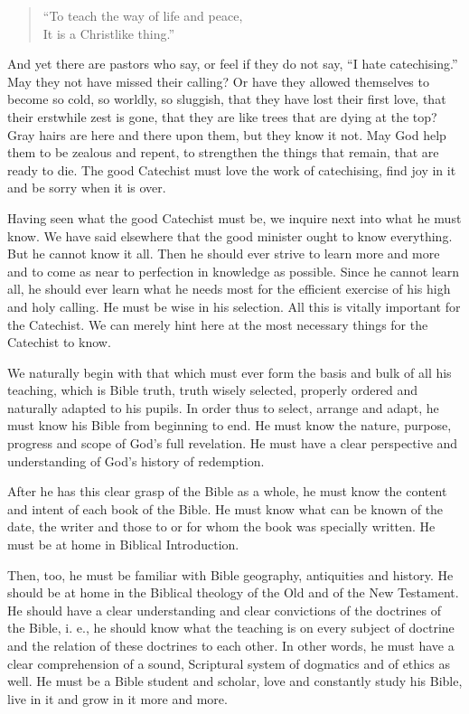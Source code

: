 \begin{quote}“To teach the way of life and peace,\\It is a Christlike thing.”\end{quote}

And yet there are pastors who say, or feel if they do not say, “I hate catechising.” May they not have missed their calling? Or have they allowed themselves to become so cold, so worldly, so sluggish,
that they have lost their first love, that their erstwhile zest is gone, that they are like trees that are dying at the top? Gray hairs are here and there upon them, but they know it not. May God help them to be zealous and repent, to strengthen the things that remain, that are ready to die. The good Catechist must love the work of catechising, find joy in it and be sorry when it is over.

 Having seen what the good Catechist must be, we inquire next into what he must know. We have said elsewhere that the good minister ought to know everything. But he cannot know it all. Then he should ever strive to learn more and more and to come as near to perfection in knowledge as possible. Since he cannot learn all, he should ever learn what he needs most for the efficient exercise of his high and holy calling. He must be wise in his selection. All this is vitally important for the Catechist. We can merely hint here at the most necessary things for the Catechist to know.

 We naturally begin with that which must ever form the basis and bulk of all his teaching, which is Bible truth, truth wisely selected, properly ordered and naturally adapted to his pupils. In order thus to select, arrange and adapt, he must know his Bible from beginning to end. He must know the nature, purpose, progress and scope of God’s full revelation.
He must have a clear perspective and understanding of God’s history of redemption.

 After he has this clear grasp of the Bible as a whole, he must know the content and intent of each book of the Bible. He must know what can be known of the date, the writer and those to or for whom the book was specially written. He must be at home in Biblical Introduction.

Then, too, he must be familiar with Bible geography, antiquities and history. He should be at home in the Biblical theology of the Old and of the New Testament.  He should have a clear understanding and clear convictions of the doctrines of the Bible, i. e., he should know what the teaching is on every subject of doctrine and the relation of these doctrines to each other. In other words, he must have a clear comprehension of a sound, Scriptural system of dogmatics and of ethics as well. He must be a Bible student and scholar, love and constantly study his Bible, live in it and grow in it more and more.


